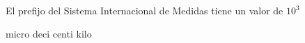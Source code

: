 
\question El prefijo \fillin \enspace del Sistema Internacional de Medidas
tiene un valor de $10^3$

  \begin{oneparchoices}
    \choice micro
    \choice deci
    \choice centi
    \CorrectChoice kilo
  \end{oneparchoices}
  \answerline[D]
